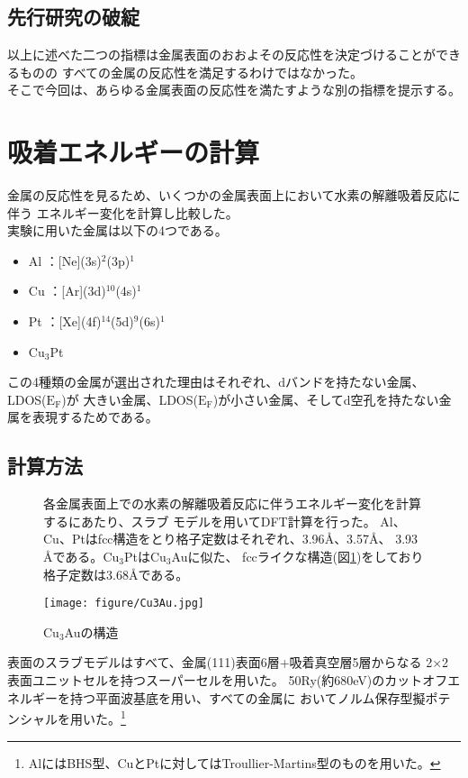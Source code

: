 \documentclass[12pt]{ltjsarticle}
\begin{document}
\subsection{先行研究の破綻}
以上に述べた二つの指標は金属表面のおおよその反応性を決定づけることができるものの
すべての金属の反応性を満足するわけではなかった。\\
そこで今回は、あらゆる金属表面の反応性を満たすような別の指標を提示する。\cite{Science1995}

\section{吸着エネルギーの計算}
金属の反応性を見るため、いくつかの金属表面上において水素の解離吸着反応に伴う
エネルギー変化を計算し比較した。\\
実験に用いた金属は以下の4つである。
\begin{itemize}
 \item Al ：[Ne](3s)$^\text{2}$(3p)$^\text{1}$
 \item Cu ：[Ar](3d)$^\text{10}$(4s)$^\text{1}$
 \item Pt ：[Xe](4f)$^\text{14}$(5d)$^\text{9}$(6s)$^\text{1}$
 \item $\text{Cu}_\text{3}$Pt
\end{itemize}
この4種類の金属が選出された理由はそれぞれ、dバンドを持たない金属、LDOS($\text{E}_\text{F}$)が
大きい金属、LDOS($\text{E}_\text{F}$)が小さい金属、そしてd空孔を持たない金属を表現するためである。

\subsection{計算方法}

\begin{figure}[hbtp]
\begin{minipage}{.5\textwidth}
    各金属表面上での水素の解離吸着反応に伴うエネルギー変化を計算するにあたり、スラブ
    モデルを用いてDFT計算を行った。
    Al、Cu、Ptはfcc構造をとり格子定数はそれぞれ、3.96$\mbox{\AA}$、3.57$\mbox{\AA}$、
    3.93$\mbox{\AA}$である。$\text{Cu}_\text{3}$Ptは$\text{Cu}_\text{3}$Auに似た、
    fccライクな構造(図\ref{fig:Cu3Au})をしており格子定数は3.68$\mbox{\AA}$である。
\end{minipage}
\hfill
\begin{minipage}{.45\textwidth}
    \begin{center}
     \texttt{[image: figure/Cu3Au.jpg]}
    \end{center}
    \caption{Cu$_\text{3}$Auの構造}
    \label{fig:Cu3Au}
\end{minipage}
\end{figure}
表面のスラブモデルはすべて、金属(111)表面6層+吸着真空層5層からなる
2×2表面ユニットセルを持つスーパーセルを用いた。
50Ry(約680eV)のカットオフエネルギーを持つ平面波基底を用い、すべての金属に
おいてノルム保存型擬ポテンシャルを用いた。\footnote{AlにはBHS型、CuとPtに対してはTroullier-Martins型のものを用いた。}
\end{document}
